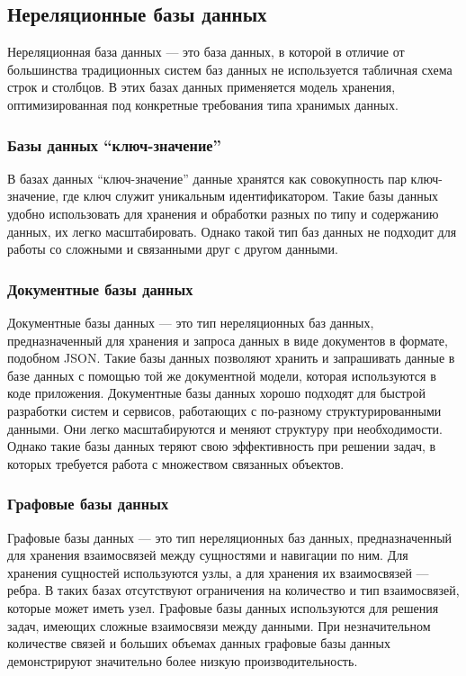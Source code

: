 \subsection*{Нереляционные базы данных}

Нереляционная база данных --- это база данных, в которой в отличие от большинства традиционных систем баз данных не используется табличная схема строк и столбцов. В этих базах данных применяется модель хранения, оптимизированная под конкретные требования типа хранимых данных.

\subsubsection{Базы данных \enquote{ключ-значение}}

В базах данных \enquote{ключ-значение} данные хранятся как совокупность пар ключ-значение, где ключ служит уникальным идентификатором. Такие базы данных удобно использовать для хранения и обработки разных по типу и содержанию данных, их легко масштабировать. Однако такой тип баз данных не подходит для работы со сложными и связанными друг с другом данными.

\subsubsection{Документные базы данных}

Документные базы данных --- это тип нереляционных баз данных, предназначенный для хранения и запроса данных в виде документов в формате, подобном JSON. Такие базы данных позволяют хранить и запрашивать данные в базе данных с помощью той же документной модели, которая используются в коде приложения. Документные базы данных хорошо подходят для быстрой разработки систем и сервисов, работающих с по-разному структурированными данными. Они легко масштабируются и меняют структуру при необходимости. Однако такие базы данных теряют свою эффективность при решении задач, в которых требуется работа с множеством связанных объектов.

\subsubsection{Графовые базы данных}

Графовые базы данных --- это тип нереляционных баз данных, предназначенный для хранения взаимосвязей между сущностями и навигации по ним. Для хранения сущностей используются узлы, а для хранения их взаимосвязей --- ребра. В таких базах отсутствуют ограничения на количество и тип взаимосвязей, которые может иметь узел. Графовые базы данных используются для решения задач, имеющих сложные взаимосвязи между данными. При незначительном количестве связей и больших объемах данных графовые базы данных демонстрируют значительно более низкую производительность.

